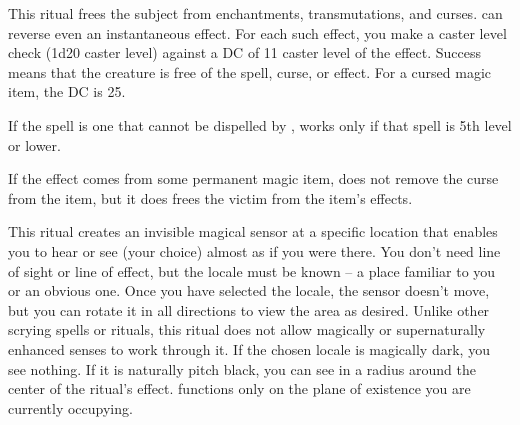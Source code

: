 \spellrng{\rngclose}
\begin{spelleffect}
This ritual frees the subject from enchantments, transmutations, and curses.  can reverse even an instantaneous effect. For each such effect, you make a caster level check (1d20 \add caster level) against a DC of 11 \add caster level of the effect. Success means that the creature is free of the spell, curse, or effect. For a cursed magic item, the DC is 25.
\par If the spell is one that cannot be dispelled by ,  works only if that spell is 5th level or lower.
\par If the effect comes from some permanent magic item,  does not remove the curse from the item, but it does frees the victim from the item's effects.
\end{spelleffect}

\begin{spelleffect}
This ritual creates an invisible magical sensor at a specific location that enables you to hear or see (your choice) almost as if you were there. You don't need line of sight or line of effect, but the locale must be known -- a place familiar to you or an obvious one. Once you have selected the locale, the sensor doesn't move, but you can rotate it in all directions to view the area as desired. Unlike other scrying spells or rituals, this ritual does not allow magically or supernaturally enhanced senses to work through it. If the chosen locale is magically dark, you see nothing. If it is naturally pitch black, you can see in a \areasmall radius around the center of the ritual's effect.  functions only on the plane of existence you are currently occupying.
\end{spelleffect}

